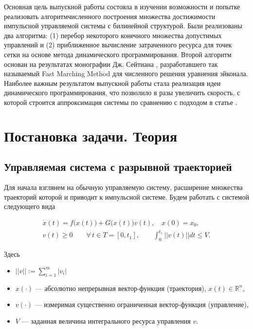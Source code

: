 \documentclass[a4paper,12pt]{article}
\begin{document}
Основная цель выпускной работы состояла в изучении возможности и
попытке реализовать алгоритмчисленного построения множества
достижимости импульсной управляемой системы с билинейной
структурой. Были реализованы два алгоритма: (1) перебор некоторого
конечного множества допустимых управлений и (2) приближенное
вычисление затраченного ресурса для точек сетки на основе метода
динамического программирования. Второй алгоритм основан на результатах
монографии Дж. Сейтиана \cite{S1999}, разработавшего так называемый
Fast Marching Method для численного решения уравнения эйконала.
Наиболее важным результатом выпускной работы стала реализация идеи
динамического программирования, что позволило в разы увеличить
скорость, с которой строится аппроксимация системы по сравнению с
подходом в статье \cite{BS2005}.

\section{Постановка задачи. Теория}
\label{sec:theory}

\subsection {Управляемая система с разрывной траекторией}
\label{sec:csdisttrack}

Для начала взглянем на обычную управляемую систему, расширение
множества траекторий которой и приводит к импульсной системе. Будем
работать с системой следующего вида

\begin{equation}
    \label{system_s}
    \begin{array}{l}
        \dot{x}(t)=f\big(x(t)\big)+G\big(x(t)\big)v(t), \quad x(0)=x_0, \\[8pt]
        v(t)\geq 0  \qquad \forall\, t\in T = [0,t_1], \qquad
        \displaystyle\int_{0}^{t_1} ||v(t)||dt\leq V.
    \end{array} \tag{$S$}
\end{equation}

Здесь
\begin{itemize}
    \item $||v||:=\displaystyle\sum_{i=1}^m |v_i|$
    \item $x(\cdot)$ --- абсолютно непрерывная вектор-функция
        (траектория), $x(t)\in {\mathbb R}^n,$
    \item $v(\cdot)$ --- измеримая существенно ограниченная
        вектор-функция (управление),

    \item $V$ --- заданная величина интегрального ресурса управления
        $v$.
\end{itemize}
\end{document}

